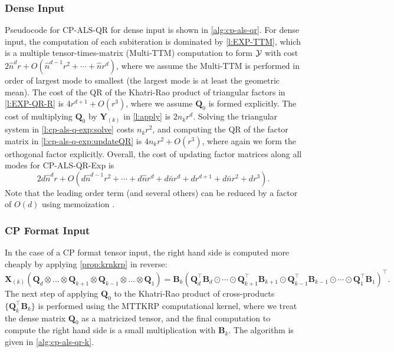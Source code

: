 \documentclass{article}
\newcommand{\mat}[1]{\mathbf{#1}}
\newcommand{\T}[2][]{#1{\mathbf{\cal{#2}}}} 						%
\begin{document}
\subsubsection{Dense Input}

Pseudocode for CP-ALS-QR for dense input is shown in \cref{alg:cp-als-qr}.
For dense input, the computation of each subiteration is dominated by \cref{l:EXP-TTM}, which is a multiple tensor-times-matrix (Multi-TTM) computation to form $\T{Y}$ with cost
$2\hat{n}^dr+O(\hat{n}^{d-1}r^2 + \cdots + \hat{n}r^d)$, where we assume the Multi-TTM is performed in order of largest mode to smallest (the largest mode is at least the geometric mean).
The cost of the QR of the Khatri-Rao product of triangular factors in \cref{l:EXP-QR-R} is $4r^{d+1}+O(r^3)$, where we assume $\mat{Q}_0$ is formed explicitly.
The cost of multiplying $\mat{Q}_0$ by $\mat{Y}_{(k)}$ in \cref{l:apply} is $2n_kr^d$.
Solving the triangular system in \cref{l:cp-als-q-exp:solve} costs $n_kr^2$, and computing the QR of the factor matrix in \cref{l:cp-als-q-exp:updateQR} is $4n_kr^2+O(r^3)$, where again we form the orthogonal factor explicitly.
%
Overall, the cost of updating factor matrices along all modes for CP-ALS-QR-Exp is
$$2d\hat{n}^dr + O(d\hat{n}^{d-1}r^2 + \cdots + d\hat{n}r^d + d\bar{n}r^d+ dr^{d+1} + d\bar{n}r^2 + dr^3 ).$$
Note that the leading order term (and several others) can be reduced by a factor of $O(d)$ using memoization \cite{KR19}.

\subsubsection{CP Format Input}
\label{sec:expqr:cpinput}

In the case of a CP format tensor input, the right hand side is computed more cheaply by applying \cref{prop:krnkrp} in reverse:
\begin{equation*}
 \mat{X}_{(k)}(\mat{Q}_d \otimes \dots \otimes \mat{Q}_{k+1} \otimes \mat{Q}_{k-1} \otimes \dots \otimes \mat{Q}_1) = 
 \mat{B}_k(\mat{Q}_d^\top\mat{B}_d \odot \cdots \odot \mat{Q}_{k+1}^\top\mat{B}_{k+1} \odot \mat{Q}_{k-1}^\top\mat{B}_{k-1} \odot \cdots \odot \mat{Q}_1^\top\mat{B}_1)^\top.
\end{equation*}
The next step of applying $\mat{Q}_0$ to the Khatri-Rao product of cross-products $\{\mat{Q}_k^\top\mat{B}_k\}$ is performed using the MTTKRP computational kernel, where we treat the dense matrix $\mat{Q}_0$ as a matricized tensor, and the final computation to compute the right hand side is a small multiplication with $\mat{B}_k$.
The algorithm is given in \cref{alg:cp-als-qr-k}.
\end{document}
